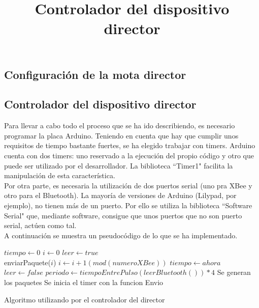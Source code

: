 \subsection{Configuración de la mota director}


\subsection{Controlador del dispositivo director}
\title{Controlador del dispositivo director}

Para llevar a cabo todo el proceso que se ha ido describiendo, es necesario programar
la placa Arduino. Teniendo en cuenta que hay que cumplir unos requisitos de tiempo bastante
fuertes, se ha elegido trabajar con timers. Arduino cuenta con dos timers: uno reservado
a la ejecución del propio código y otro que puede ser utilizado por el desarrollador.
La biblioteca ``Timer1" \cite{timeronearduino} facilita la manipulación de esta característica.\\

Por otra parte, es necesaria la utilización de dos puertos serial (uno pra XBee y otro para el Bluetooth).
La mayoría de versiones de Arduino (Lilypad, por ejemplo), no tienen más de un puerto.
Por ello se utiliza la biblioteca ``Software Serial" \cite{softwareserial} que, mediante software, consigue
que unos puertos que no son puerto serial, actúen como tal.\\

A continuación se muestra un pseudocódigo de lo que se ha implementado.
\begin{algorithm}
  \begin{algorithmic}[1]
     \State $tiempo\gets 0$
     \State $i\gets 0$
     \State $leer \gets true$\\

        \State enviarPaquete($i$)
        \State $i \gets i+1(mod(numeroXBee))$
        \State $tiempo \gets ahora$
      \EndIf
      \EndFunction\\

        \State $leer \gets false$
        \State $periodo\gets tiempoEntrePulso(leerBluetooth())*4$
        \State Se generan los paquetes
        \State Se inicia el timer con la funcion Envio
      \EndIf
     \EndIf
    \EndWhile
  \end{algorithmic}
  \caption{Algoritmo utilizando por el controlador del director}
\end{algorithm}

